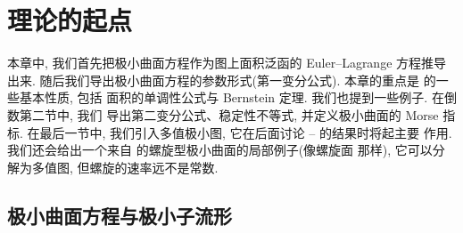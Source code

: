 \chapter{理论的起点}
\label{chap:1}

本章中, 我们首先把极小曲面方程作为图上面积泛函的 Euler--Lagrange 方程推导
出来. 随后我们导出极小曲面方程的参数形式(第一变分公式). 本章的重点是
的一些基本性质, 包括
面积的单调性公式与 Bernstein 定理. 我们也提到一些例子. 在倒数第二节中, 我们
导出第二变分公式、稳定性不等式, 并定义极小曲面的 Morse 指标. 在最后一节中,
我们引入多值极小图, 它在后面讨论 \cite{CM3}--\cite{CM7} 的结果时将起主要
作用. 我们还会给出一个来自 \cite{CM18} 的螺旋型极小曲面的局部例子(像螺旋面
那样), 它可以分解为多值图, 但螺旋的速率远不是常数.

\section{极小曲面方程与极小子流形}
\label{sec:1.1}

